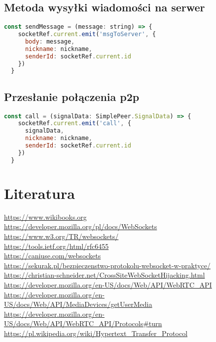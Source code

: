 \documentclass{article}
\begin{document}
\subsection{Metoda wysyłki wiadomości na serwer}
\begin{lstlisting}[language=JavaScript]
  const sendMessage = (message: string) => {
    socketRef.current.emit('msgToServer', {
      body: message,
      nickname: nickname,
      senderId: socketRef.current.id
    })
  }
\end{lstlisting}

\subsection{Przesłanie połączenia p2p}
\begin{lstlisting}[language=JavaScript]
  const call = (signalData: SimplePeer.SignalData) => {
    socketRef.current.emit('call', {
      signalData,
      nickname: nickname,
      senderId: socketRef.current.id
    })
  }
\end{lstlisting}

\section{Literatura}

\url{https://www.wikibooks.org}\\
\url{https://developer.mozilla.org/pl/docs/WebSockets}\\
\url{https://www.w3.org/TR/websockets/}\\
\url{https://tools.ietf.org/html/rfc6455}\\
\url{https://caniuse.com/websockets}\\
\url{https://sekurak.pl/bezpieczenstwo-protokolu-websocket-w-praktyce/}\\
\url{https://christian-schneider.net/CrossSiteWebSocketHijacking.html}\\
\url{https://developer.mozilla.org/en-US/docs/Web/API/WebRTC_API}\\
\url{https://developer.mozilla.org/en-US/docs/Web/API/MediaDevices/getUserMedia}\\
\url{https://developer.mozilla.org/en-US/docs/Web/API/WebRTC_API/Protocols#turn}\\
\url{https://pl.wikipedia.org/wiki/Hypertext_Transfer_Protocol}
\end{document}
